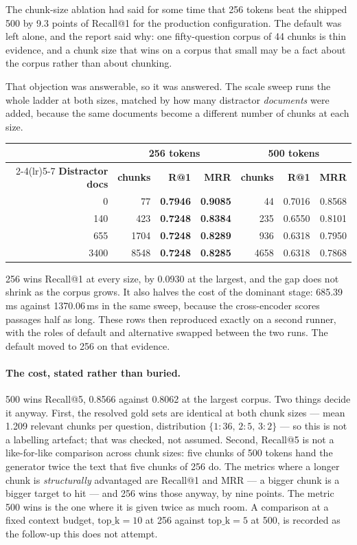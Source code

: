 \documentclass[11pt,a4paper]{article}
\begin{document}
The chunk-size ablation had said for some time that 256 tokens beat the shipped
500 by 9.3 points of Recall@1 for the production configuration. The default was
left alone, and the report said why: one fifty-question corpus of 44 chunks is
thin evidence, and a chunk size that wins on a corpus that small may be a fact
about the corpus rather than about chunking.

That objection was answerable, so it was answered. The scale sweep runs the whole
ladder at both sizes, matched by how many distractor \emph{documents} were added,
because the same documents become a different number of chunks at each size.

\begin{center}
\small
\begin{tabular}{@{}rrrrrrr@{}}
\toprule
& \multicolumn{3}{c}{\textbf{256 tokens}} & \multicolumn{3}{c}{\textbf{500 tokens}} \\
\cmidrule(lr){2-4}\cmidrule(lr){5-7}
\textbf{Distractor docs} & \textbf{chunks} & \textbf{R@1} & \textbf{MRR} & \textbf{chunks} & \textbf{R@1} & \textbf{MRR} \\
\midrule
0    & 77   & \textbf{0.7946} & \textbf{0.9085} & 44   & 0.7016 & 0.8568 \\
140  & 423  & \textbf{0.7248} & \textbf{0.8384} & 235  & 0.6550 & 0.8101 \\
655  & 1704 & \textbf{0.7248} & \textbf{0.8289} & 936  & 0.6318 & 0.7950 \\
3400 & 8548 & \textbf{0.7248} & \textbf{0.8285} & 4658 & 0.6318 & 0.7868 \\
\bottomrule
\end{tabular}
\end{center}

256 wins Recall@1 at every size, by 0.0930 at the largest, and the gap does not
shrink as the corpus grows. It also halves the cost of the dominant stage:
685.39\,ms against 1370.06\,ms in the same sweep, because the cross-encoder scores
passages half as long. These rows then reproduced exactly on a second runner,
with the roles of default and alternative swapped between the two runs. The
default moved to 256 on that evidence.

\paragraph{The cost, stated rather than buried.} 500 wins Recall@5, 0.8566
against 0.8062 at the largest corpus. Two things decide it anyway. First, the
resolved gold sets are identical at both chunk sizes --- mean 1.209 relevant
chunks per question, distribution $\{1{:}36,\,2{:}5,\,3{:}2\}$ --- so this is not
a labelling artefact; that was checked, not assumed. Second, Recall@5 is not a
like-for-like comparison across chunk sizes: five chunks of 500 tokens hand the
generator twice the text that five chunks of 256 do. The metrics where a longer
chunk is \emph{structurally} advantaged are Recall@1 and MRR --- a bigger chunk
is a bigger target to hit --- and 256 wins those anyway, by nine points. The
metric 500 wins is the one where it is given twice as much room. A comparison at
a fixed context budget, $\mathrm{top\_k}=10$ at 256 against $\mathrm{top\_k}=5$ at
500, is recorded as the follow-up this does not attempt.
\end{document}
